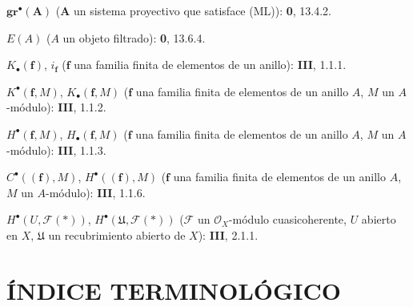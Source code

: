 \begin{flushleft}
$\mathbf{gr}^\bullet(\mathbf A)$ ($\mathbf A$ un sistema proyectivo que satisface (ML)):
\textbf 0, 13.4.2.

$E(A)$ ($A$ un objeto filtrado): \textbf 0, 13.6.4.

$K_\bullet(\mathbf f)$, $i_{\mathbf f}$ ($\mathbf f$ una familia finita de
elementos de un anillo): \textbf{III}, 1.1.1.

$K^\bullet(\mathbf f,M)$, $K_\bullet(\mathbf f,M)$ ($\mathbf f$ una familia
finita de elementos de un anillo $A$, $M$ un $A$-módulo): \textbf{III}, 1.1.2.

$H^\bullet(\mathbf f,M)$, $H_\bullet(\mathbf f,M)$ ($\mathbf f$ una familia
finita de elementos de un anillo $A$, $M$ un $A$-módulo): \textbf{III}, 1.1.3.

$C^\bullet((\mathbf f),M)$, $H^\bullet((\mathbf f),M)$ ($\mathbf f$ una
familia finita de elementos de un anillo $A$, $M$ un $A$-módulo): \textbf{III}, 1.1.6.

$H^\bullet(U,\mathcal F(*))$,
$H^\bullet(\mathfrak U,\mathcal F(*))$ ($\mathcal F$ un
$\mathcal O_X$-módulo cuasicoherente, $U$ abierto en $X$, $\mathfrak U$ un recubrimiento abierto de $X$):
\textbf{III}, 2.1.1.
\end{flushleft}

\clearpage
{}
\section*{ÍNDICE TERMINOLÓGICO}

